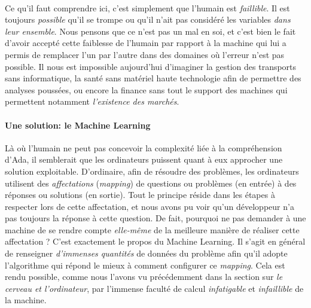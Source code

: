 \paragraph{} Ce qu'il faut comprendre ici, c'est simplement que l'humain est \emph{faillible}. Il est toujours \emph{possible} qu'il se trompe
ou qu'il n'ait pas considéré les variables \emph{dans leur ensemble}. Nous pensons que ce n'est pas un mal en soi, et c'est bien le fait d'avoir accepté cette
faiblesse de l'humain par rapport à la machine qui lui a permis de remplacer l'un par l'autre dans des domaines où l'erreur n'est pas possible.
Il nous est impossible aujourd'hui d'imaginer la gestion des transports sans informatique, la santé sans matériel haute technologie afin de
permettre des analyses poussées, ou encore la finance sans tout le support des machines qui permettent notamment \emph{l'existence des marchés}. 

\paragraph{Une solution: le Machine Learning} Là où l'humain ne peut pas concevoir la complexité liée à la compréhension d'Ada, il semblerait que les
ordinateurs puissent quant à eux approcher une solution exploitable. D'ordinaire, afin de résoudre des problèmes, les ordinateurs utilisent des \emph{affectations}
(\emph{mapping}) de questions ou problèmes (en entrée) à des réponses ou solutions (en sortie). Tout le principe réside dans les étapes à respecter lors de
cette affectation, et nous avons pu voir qu'un développeur n'a pas toujours la réponse à cette question. De fait, pourquoi ne pas demander à une 
machine de se rendre compte \emph{elle-même} de la meilleure manière de réaliser cette affectation \cite{MachineLearning0} ? C'est exactement le propos du Machine
Learning. Il s'agit en général de renseigner \emph{d'immenses quantités} de données du problème afin qu'il adopte l'algorithme qui répond le mieux à
comment configurer ce \emph{mapping}. Cela est rendu possible, comme nous l'avons vu précédemment dans la section sur \emph{le cerveau et l'ordinateur},
par l'immense faculté de calcul \emph{infatigable} et \emph{infaillible} de la machine.

